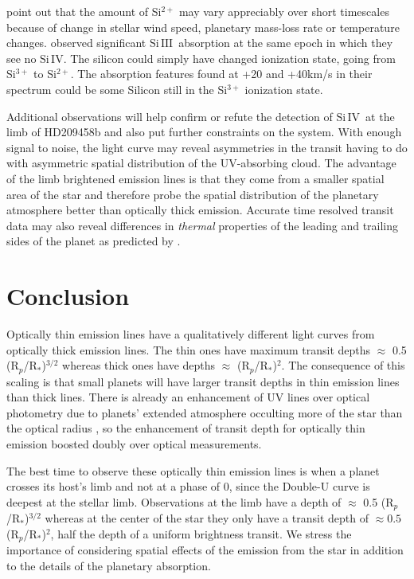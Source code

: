 \documentclass[manuscript]{aastex}
\newcommand{\siIV}{\ensuremath{\mathrm{Si}\,\scriptstyle \mathrm{IV}}}
\newcommand{\siIII}{\ensuremath{\mathrm{Si}\,\scriptstyle \mathrm{III}}}
\newcommand{\p}{R$_p$/R$_*$}
\begin{document}
\citet{linsky} point out that the amount of Si$^{2+}$ may vary appreciably over short timescales because of change in stellar wind speed, planetary mass-loss rate or temperature changes. \citet{linsky} observed significant \siIII\ absorption at the same epoch in which they see no \siIV. The silicon could simply have changed ionization state, going from Si$^{3+}$ to Si$^{2+}$. The absorption features found at +20 and +40km/s in their spectrum could be some Silicon still in the Si$^{3+}$ ionization state.

Additional observations will help confirm or refute the detection of \siIV\ at the limb of HD209458b and also put further constraints on the system. With enough signal to noise, the light curve may reveal asymmetries in the transit having to do with asymmetric spatial distribution of the UV-absorbing cloud. The advantage of the limb brightened emission lines is that they come from a smaller spatial area of the star and therefore probe the spatial distribution of the planetary atmosphere better than optically thick emission. Accurate time resolved transit data may also reveal differences in {\it thermal} properties of the leading and trailing sides of the planet as predicted by \citet{fortney}.

\section{Conclusion}

Optically thin emission lines have a qualitatively different light curves from optically thick emission lines. The thin ones have maximum transit depths $\approx$ 0.5 (\p )$^{3/2}$ whereas thick ones have depths $\approx$ (\p )$^2$. The consequence of this scaling is that small planets will have larger transit depths in thin emission lines than thick lines. There is already an enhancement of UV lines over optical photometry due  to planets' extended atmosphere occulting more of the star than the optical radius \citep{kosk}, so the enhancement of transit depth for optically thin emission boosted doubly over optical measurements.

The best time to observe these optically thin emission lines is when a planet crosses its host's limb and not at a phase of 0, since the Double-U curve is deepest at the stellar limb. Observations at the limb have a depth of $\approx$ 0.5 (\p )$^{3/2}$ whereas at the center of the star they only have a transit depth of  $\approx 0.5 $(\p)$^2$, half the depth of a uniform brightness transit. We stress the importance of considering spatial effects of the emission from the star in addition to the details of the planetary absorption.
\end{document}

